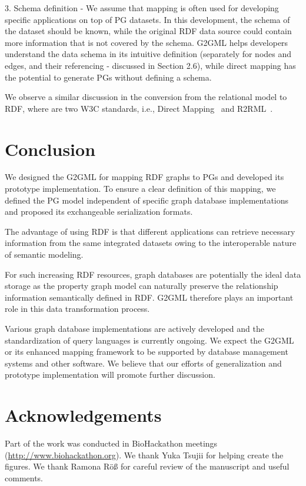 \documentclass[runningheads]{llncs}
\begin{document}
3. Schema definition - We assume that mapping is often used for developing specific applications on top of PG datasets. In this development, the schema of the dataset should be known, while the original RDF data source could contain more information that is not covered by the schema. G2GML helps developers understand the data schema in its intuitive definition (separately for nodes and edges, and their referencing - discussed in Section 2.6), while direct mapping has the potential to generate PGs without defining a schema.

We observe a similar discussion in the conversion from the relational model to RDF, where are two W3C standards, i.e., Direct Mapping~\cite{dm} and R2RML~\cite{r2rml}.


\section{Conclusion}

We designed the G2GML for mapping RDF graphs to PGs and developed its prototype implementation. To ensure a clear definition of this mapping, we defined the PG model independent of specific graph database implementations and proposed its exchangeable serialization formats.

The advantage of using RDF is that different applications can retrieve necessary information from the same integrated datasets owing to the interoperable nature of semantic modeling.

For such increasing RDF resources, graph databases are potentially the ideal data storage as the property graph model can naturally preserve the relationship information semantically defined in RDF. G2GML therefore plays an important role in this data transformation process. 

Various graph database implementations are actively developed and the standardization of query languages is currently ongoing. We expect the G2GML or its enhanced mapping framework to be supported by database management systems and other software. We believe that our efforts of generalization and prototype implementation will promote further discussion.



\section*{Acknowledgements}
Part of the work was conducted in BioHackathon meetings (\url{http://www.biohackathon.org}). We thank Yuka Tsujii for helping create the figures. We thank Ramona Röß for careful review of the manuscript and useful comments.
\end{document}
